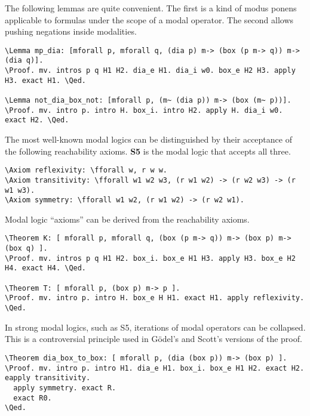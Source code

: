 \documentclass{llncs}
\newcommand{\red}[1]{\textcolor[rgb]{1,0,0}{#1}}
\newcommand{\blue}[1]{\textcolor[rgb]{0,0,1}{#1}}
\newcommand{\Axiom}{\red{Axiom}}
\newcommand{\Lemma}{\red{Lemma}}
\newcommand{\Theorem}{\red{Theorem}}
\newcommand{\fforall}{\blue{forall}}
\newcommand{\Proof}{\blue{Proof}}
\newcommand{\Qed}{\blue{Qed}}
\begin{document}
\noindent
The following lemmas are quite convenient. The first is a kind of modus ponens applicable to formulas under the scope of a modal operator. The second allows pushing negations inside modalities.

\begin{Verbatim}[commandchars=\\\{\},fontsize=\verbsize]
\Lemma mp_dia: [mforall p, mforall q, (dia p) m-> (box (p m-> q)) m-> (dia q)].
\Proof. mv. intros p q H1 H2. dia_e H1. dia_i w0. box_e H2 H3. apply H3. exact H1. \Qed.

\Lemma not_dia_box_not: [mforall p, (m~ (dia p)) m-> (box (m~ p))].
\Proof. mv. intro p. intro H. box_i. intro H2. apply H. dia_i w0. exact H2. \Qed.
\end{Verbatim}

\noindent
The most well-known modal logics can be distinguished by their acceptance of the following reachability axioms. \textbf{S5} is the modal logic that accepts all three.

\begin{Verbatim}[commandchars=\\\{\},fontsize=\verbsize]
\Axiom reflexivity: \fforall w, r w w.
\Axiom transitivity: \fforall w1 w2 w3, (r w1 w2) -> (r w2 w3) -> (r w1 w3).
\Axiom symmetry: \fforall w1 w2, (r w1 w2) -> (r w2 w1).
\end{Verbatim}

\noindent
Modal logic ``axioms'' can be derived from the reachability axioms.

\begin{Verbatim}[commandchars=\\\{\},fontsize=\verbsize]
\Theorem K: [ mforall p, mforall q, (box (p m-> q)) m-> (box p) m-> (box q) ].
\Proof. mv. intros p q H1 H2. box_i. box_e H1 H3. apply H3. box_e H2 H4. exact H4. \Qed.

\Theorem T: [ mforall p, (box p) m-> p ].
\Proof. mv. intro p. intro H. box_e H H1. exact H1. apply reflexivity. \Qed.
\end{Verbatim}

\noindent
In strong modal logics, such as S5, iterations of modal operators can be collapsed. This is a controversial principle used in G\"odel's and Scott's versions of the proof.

\begin{Verbatim}[commandchars=\\\{\},fontsize=\verbsize]
\Theorem dia_box_to_box: [ mforall p, (dia (box p)) m-> (box p) ].
\Proof. mv. intro p. intro H1. dia_e H1. box_i. box_e H1 H2. exact H2. eapply transitivity.
  apply symmetry. exact R.
  exact R0.
\Qed.
\end{Verbatim}
\end{document}
